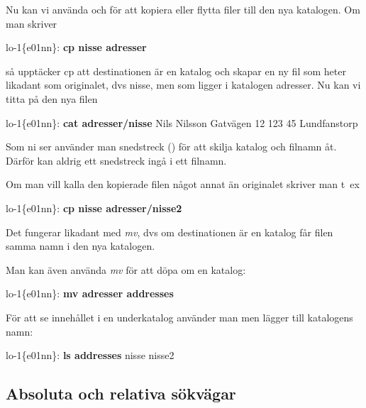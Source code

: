 \documentclass[a4paper,twocolumn]{book}
\begin{document}
Nu kan vi använda  och  för att kopiera eller
flytta filer till den nya katalogen. Om man skriver
\begin{example}
lo-1\{e01nn\}: \textbf{cp nisse adresser}
\end{example}
så upptäcker cp att destinationen är en katalog och skapar en ny fil
som heter likadant som originalet, dvs nisse, men som ligger i
katalogen adresser. Nu kan vi titta på den nya filen
\begin{example}
lo-1\{e01nn\}: \textbf{cat adresser/nisse}
Nils Nilsson
Gatvägen 12
123 45 Lundfanstorp
\end{example}
Som ni ser använder man snedstreck (\ST{/}) för att skilja katalog och
filnamn åt. Därför kan aldrig ett snedstreck ingå i ett filnamn.

Om man vill kalla den kopierade filen något annat än originalet
skriver man t~ex
\begin{example}
lo-1\{e01nn\}: \textbf{cp nisse adresser/nisse2}
\end{example} 
Det fungerar likadant med \emph{mv}, dvs om destinationen är en
katalog får filen samma namn i den nya katalogen.

Man kan även använda \emph{mv} för att döpa om en katalog:
\begin{example}
lo-1\{e01nn\}: \textbf{mv adresser addresses}
\end{example}
För att se innehållet i en underkatalog använder man  men
lägger till katalogens namn:
\begin{example}
lo-1\{e01nn\}: \textbf{ls addresses}
nisse    nisse2
\end{example}
\subsection{Absoluta och relativa sökvägar}
\end{document}

